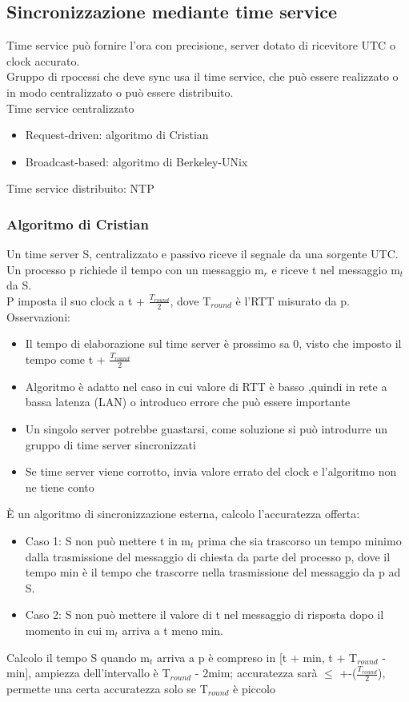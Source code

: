 \documentclass[16px]{article}
\begin{document}
\subsection{Sincronizzazione mediante time service}
Time service può fornire l'ora con precisione, server dotato di ricevitore UTC o clock accurato.\\ Gruppo di rpocessi che deve sync usa il time service, che può essere realizzato o in modo centralizzato o può essere distribuito.\\ Time service centralizzato
\begin{itemize}
\item Request-driven: algoritmo di Cristian
\item Broadcast-based: algoritmo di Berkeley-UNix
\end{itemize}
Time service distribuito: NTP
\subsubsection{Algoritmo di Cristian} 
Un time server S, centralizzato e passivo riceve il segnale da una sorgente UTC. Un processo p richiede il tempo con un messaggio m$_r$ e riceve t nel messaggio m$_t$ da S.\\ P imposta il suo clock a t + $\frac{T_{round}}{2}$, dove T$_{round}$ è l'RTT misurato da p. Osservazioni:
\begin{itemize}
\item Il tempo di elaborazione sul time server è prossimo sa 0, visto che imposto il tempo come t + $\frac{T_{round}}{2}$
\item Algoritmo è adatto nel caso in cui valore di RTT è basso ,quindi in rete a bassa latenza (LAN) o introduco errore che può essere importante
\item Un singolo server potrebbe guastarsi, come soluzione si può introdurre un gruppo di time server sincronizzati
\item Se time server viene corrotto, invia valore errato del clock e l'algoritmo non ne tiene conto
\end{itemize} È un algoritmo di sincronizzazione esterna, calcolo l'accuratezza offerta:
\begin{itemize}
\item Caso 1: S non può mettere t in m$_t$ prima che sia trascorso un tempo minimo dalla trasmissione del messaggio di chiesta da parte del processo p, dove il tempo min è il tempo che trascorre nella trasmissione del messaggio da p ad S.
\item Caso 2: S non può mettere il valore di t nel messaggio di risposta dopo il momento in cui m$_t$ arriva a t meno min.
\end{itemize}
Calcolo il tempo S quando m$_t$ arriva a p è compreso in [t + min, t + T$_{round}$ - min], ampiezza dell'intervallo è  T$_{round}$ - 2mim; accuratezza sarà $\leq$ +-($\frac{T_{round}}{2}$), permette una certa accuratezza solo se T$_{round}$ è piccolo
\end{document}
